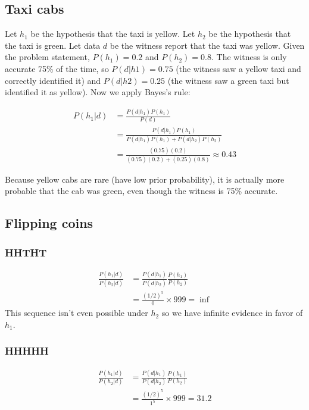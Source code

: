 \documentclass[
  letterpaper,
  DIV=11,
  numbers=noendperiod]{scrreprt}
\begin{document}
\subsection{Taxi cabs}\label{taxi-cabs-1}

Let \(h_1\) be the hypothesis that the taxi is yellow. Let \(h_2\) be
the hypothesis that the taxi is green. Let data \(d\) be the witness
report that the taxi was yellow. Given the problem statement,
\(P(h_1) = 0.2\) and \(P(h_2) = 0.8\). The witness is only accurate 75\%
of the time, so \(P(d|h1) = 0.75\) (the witness saw a yellow taxi and
correctly identified it) and \(P(d|h2) = 0.25\) (the witness saw a green
taxi but identified it as yellow). Now we apply Bayes's rule:

\[\begin{align}
P(h_1|d) &= \frac{P(d|h_1) P(h_1)}{P(d)} \\
&= \frac{P(d|h_1) P(h_1)}{P(d|h_1) P(h_1) + P(d|h_2) P(h_2)} \\
&= \frac{(0.75) (0.2)}{(0.75)(0.2) + (0.25)(0.8)} \approx 0.43
\end{align}\]

Because yellow cabs are rare (have low prior probability), it is
actually more probable that the cab was green, even though the witness
is 75\% accurate.

\subsection{Flipping coins}\label{flipping-coins-1}

\subsubsection*{HHTHT}\label{hhtht}

\[
\begin{align}
\frac{P(h_1|d)}{P(h_2|d)} &= \frac{P(d|h_1)}{P(d|h_2)} \frac{P(h_1)}{P(h_2)} \\
&= \frac{(1/2)^5}{0} \times 999 = \inf
\end{align}
\] This sequence isn't even possible under \(h_2\) so we have infinite
evidence in favor of \(h_1\).

\subsubsection*{HHHHH}\label{hhhhh}

\[
\begin{align}
\frac{P(h_1|d)}{P(h_2|d)} &= \frac{P(d|h_1)}{P(d|h_2)} \frac{P(h_1)}{P(h_2)} \\
&= \frac{(1/2)^5}{1^5} \times 999 = 31.2
\end{align}
\]
\end{document}
